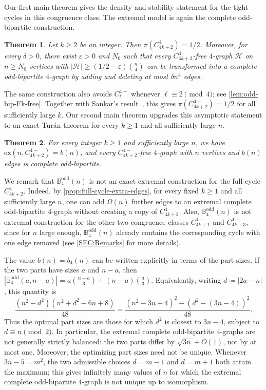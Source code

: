 \documentclass[10pt,a4paper]{article}
\theoremstyle{plain}
\newtheorem{theorem}[theorem]{Theorem}
\theoremstyle{definition}
\begin{document}
Our first main theorem gives the density and stability statement for the tight cycles in this congruence class.
The extremal model is again the complete odd-bipartite construction.

\begin{theorem}\label{THM:main_C_4k+2}
Let $k \ge 2$ be an integer.  Then $\pi(C_{4k+2}^{4}) = 1/2$. 
Moreover, for every $\delta >0$, there exist $\varepsilon > 0$ and $N_0$ such that every $C_{4k+2}^{4}$-free $4$-graph $\mathcal{H}$ on $n \ge N_0$ vertices with $|\mathcal{H}| \ge \left(1/2 - \varepsilon\right) \binom{n}{4}$ can be transformed into a complete odd-bipartite $4$-graph by adding and deleting at most $\delta n^4$ edges. 
\end{theorem}

The same construction also avoids $C_{\ell}^{4-}$ whenever $\ell \equiv 2 \pmod{4}$; see \cref{lem:odd-bip-Fk-free}.
Together with Sankar's result~\cite{San26}, this gives $\pi(C_{4k+2}^{4-})=1/2$ for all sufficiently large $k$.
Our second main theorem upgrades this asymptotic statement to an exact Tur\'{a}n theorem for every $k\ge 1$ and all sufficiently large $n$.

\begin{theorem}\label{THM:main_C_4k+2minus}
For every integer $k \ge 1$ and sufficiently large $n$, we have $\mathrm{ex}(n,C_{4k+2}^{4-}) = b(n)$, and every $C_{4k+2}^{4-}$-free $4$-graph with $n$ vertices and $b(n)$ edges is complete odd-bipartite. 
\end{theorem}

 We remark that $\mathbb{B}_{4}^{\mathrm{odd}}(n)$ is not an exact extremal construction for the full cycle $C_{4k+2}^{4}$.
Indeed, by \cref{prop:full-cycle-extra-edges}, for every fixed $k\ge1$ and all sufficiently large $n$, one can add $\Omega(n)$ further edges to an extremal complete odd-bipartite $4$-graph without creating a copy of $C_{4k+2}^{4}$.
Also, $\mathbb{B}_{4}^{\mathrm{odd}}(n)$ is not extremal construction for the other two congruence classes $C_{4k+1}^{4-}$ and $C_{4k+3}^{4-}$, since for $n$ large enough, $\mathbb{B}_{4}^{\mathrm{odd}}(n)$ already contains the corresponding cycle with one edge removed (see \cref{SEC:Remarks} for more details).


The value $b(n)=b_4(n)$ can be written explicitly in terms of the part sizes.
If the two parts have sizes $a$ and $n-a$, then $\left|\mathbb{B}_{4}^{\mathrm{odd}}(a,n-a)\right| =a\binom{n-a}{3}+(n-a)\binom{a}{3}$. 
Equivalently, writing $d \coloneqq |2a-n|$, this quantity is
\[
\frac{(n^2-d^2)(n^2+d^2-6n+8)}{48}
=\frac{(n^2-3n+4)^2-\left(d^2-(3n-4)\right)^2}{48}.
\]
Thus the optimal part sizes are those for which $d^2$ is closest to $3n-4$, subject to $d\equiv n\pmod 2$.  In particular, the extremal complete odd-bipartite $4$-graphs are not generally strictly balanced: the two parts differ by $\sqrt{3n}+O(1)$, not by at most one.
Moreover, the optimizing part sizes need not be unique.  Whenever $3n-5=m^2$, the two admissible choices $d=m-1$ and $d=m+1$ both attain the maximum; this gives infinitely many values of $n$ for which the extremal complete odd-bipartite $4$-graph is not unique up to isomorphism.
\end{document}
